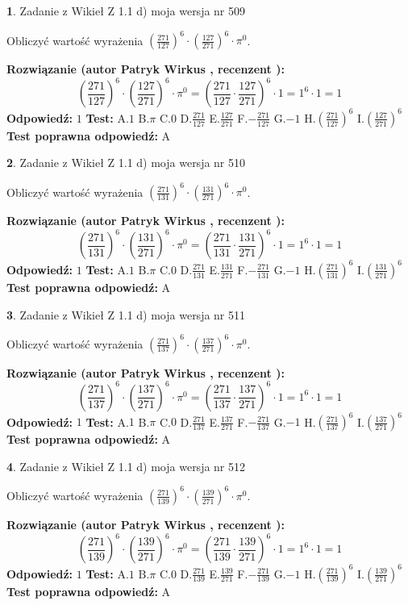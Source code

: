 \documentclass[12pt, a4paper]{article}
\theoremstyle{definition} %
\newtheorem{zad}{}
\newcommand{\zadStart}[1]{\begin{zad}#1\newline}
\newcommand{\zadStop}{\end{zad}}
\newcommand{\rozwStart}[2]{\noindent \textbf{Rozwiązanie (autor #1 , recenzent #2): }\newline}
\newcommand{\rozwStop}{\newline}
\newcommand{\odpStart}{\noindent \textbf{Odpowiedź:}\newline}
\newcommand{\odpStop}{\newline}
\newcommand{\testStart}{\noindent \textbf{Test:}\newline}
\newcommand{\testStop}{\newline}
\newcommand{\kluczStart}{\noindent \textbf{Test poprawna odpowiedź:}\newline}
\newcommand{\kluczStop}{\newline}
\begin{document}
\zadStart{Zadanie z Wikieł Z 1.1 d) moja wersja nr 509}

Obliczyć wartość wyrażenia $(\frac{271}{127})^{6} \cdot (\frac{127}{271})^{6} \cdot \pi^{0}$.
\zadStop
\rozwStart{Patryk Wirkus}{}
$$(\frac{271}{127})^{6} \cdot (\frac{127}{271})^{6} \cdot \pi^{0} = (\frac{271}{127} \cdot \frac{127}{271})^{6} \cdot 1 = 1^{6} \cdot 1 = 1$$
\rozwStop
\odpStart
$1$
\odpStop
\testStart
A.$1$ B.$\pi$ C.$0$ D.$\frac{271}{127}$ E.$\frac{127}{271}$
F.$-\frac{271}{127}$ G.$-1$
H.$(\frac{271}{127})^{6}$
I.$(\frac{127}{271})^{6}$
\testStop
\kluczStart
A
\kluczStop



\zadStart{Zadanie z Wikieł Z 1.1 d) moja wersja nr 510}

Obliczyć wartość wyrażenia $(\frac{271}{131})^{6} \cdot (\frac{131}{271})^{6} \cdot \pi^{0}$.
\zadStop
\rozwStart{Patryk Wirkus}{}
$$(\frac{271}{131})^{6} \cdot (\frac{131}{271})^{6} \cdot \pi^{0} = (\frac{271}{131} \cdot \frac{131}{271})^{6} \cdot 1 = 1^{6} \cdot 1 = 1$$
\rozwStop
\odpStart
$1$
\odpStop
\testStart
A.$1$ B.$\pi$ C.$0$ D.$\frac{271}{131}$ E.$\frac{131}{271}$
F.$-\frac{271}{131}$ G.$-1$
H.$(\frac{271}{131})^{6}$
I.$(\frac{131}{271})^{6}$
\testStop
\kluczStart
A
\kluczStop



\zadStart{Zadanie z Wikieł Z 1.1 d) moja wersja nr 511}

Obliczyć wartość wyrażenia $(\frac{271}{137})^{6} \cdot (\frac{137}{271})^{6} \cdot \pi^{0}$.
\zadStop
\rozwStart{Patryk Wirkus}{}
$$(\frac{271}{137})^{6} \cdot (\frac{137}{271})^{6} \cdot \pi^{0} = (\frac{271}{137} \cdot \frac{137}{271})^{6} \cdot 1 = 1^{6} \cdot 1 = 1$$
\rozwStop
\odpStart
$1$
\odpStop
\testStart
A.$1$ B.$\pi$ C.$0$ D.$\frac{271}{137}$ E.$\frac{137}{271}$
F.$-\frac{271}{137}$ G.$-1$
H.$(\frac{271}{137})^{6}$
I.$(\frac{137}{271})^{6}$
\testStop
\kluczStart
A
\kluczStop



\zadStart{Zadanie z Wikieł Z 1.1 d) moja wersja nr 512}

Obliczyć wartość wyrażenia $(\frac{271}{139})^{6} \cdot (\frac{139}{271})^{6} \cdot \pi^{0}$.
\zadStop
\rozwStart{Patryk Wirkus}{}
$$(\frac{271}{139})^{6} \cdot (\frac{139}{271})^{6} \cdot \pi^{0} = (\frac{271}{139} \cdot \frac{139}{271})^{6} \cdot 1 = 1^{6} \cdot 1 = 1$$
\rozwStop
\odpStart
$1$
\odpStop
\testStart
A.$1$ B.$\pi$ C.$0$ D.$\frac{271}{139}$ E.$\frac{139}{271}$
F.$-\frac{271}{139}$ G.$-1$
H.$(\frac{271}{139})^{6}$
I.$(\frac{139}{271})^{6}$
\testStop
\kluczStart
A
\kluczStop
\end{document}
